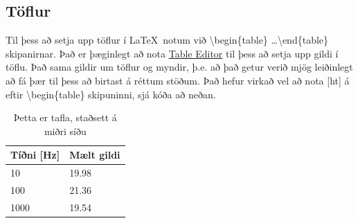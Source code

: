 \documentclass[a4paper]{article}
\begin{document}
\begin{minipage}{\linewidth} %
\end{minipage}



\subsection{Töflur }
Til þess að setja upp töflur í \LaTeX\ notum við \textbackslash begin\{table\} \dots \textbackslash end\{table\} skipanirnar. Það er þæginlegt að nota \href{http://truben.no/table/}{Table Editor} til þess að setja upp gildi í töflu. Það sama gildir um töflur og myndir, þ.e. að það getur verið mjög leiðinlegt að fá þær til þess að birtast á réttum stöðum. Það hefur virkað vel að nota [ht] á eftir  \textbackslash begin\{table\} skipuninni, sjá kóða að neðan.

\begin{table}[ht!] %
\centering	%
    \begin{tabular}{|l|l|}
    \hline
    Tíðni [Hz] & Mælt gildi \\ \hline
    10             & 19.98        \\ \hline
    100            & 21.36        \\ \hline
    1000           & 19.54        \\ \hline
    \end{tabular}
     \caption{Þetta er tafla, staðsett á miðri síðu}
\end{table}
\end{document}
